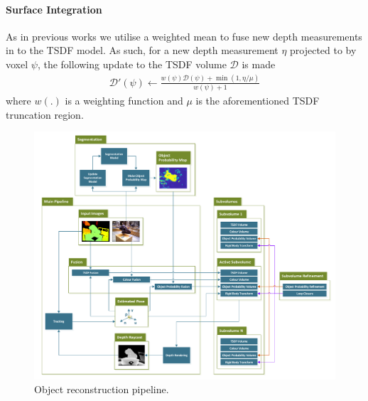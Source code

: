 \paragraph{Surface Integration}
As in previous works \cite{Newcombe2011,Prisacariu2014} we utilise a weighted mean to fuse new depth measurements in to the TSDF model. As such, 
for a new depth measurement $\eta$ projected to by voxel $\psi$, the following update to the TSDF volume $\mathcal{D}$ is made
\begin{equation}
\begin{split}
\mathcal{D}'(\psi) \leftarrow \frac{w(\psi)\mathcal{D}(\psi) + \min(1, \eta/\mu)}{w(\psi) + 1}
\end{split}
\end{equation}
where $w(.)$ is a weighting function and $\mu$ is the aforementioned TSDF truncation region.
\fi


\begin{figure}[!p]
	\centering
	\includegraphics[width=\linewidth]{pipeline.pdf}
	\caption{Object reconstruction pipeline.}
	\label{pipelineDiagram}
\end{figure}

